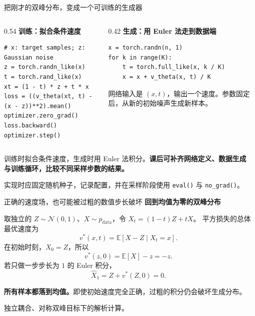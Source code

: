 \documentclass[UTF8,aspectratio=169,11pt,fontset=none]{ctexbeamer}
\newcommand{\E}{\mathbb E}
\newcommand{\pdata}{p_{\mathrm{data}}}
\newcommand{\N}{\mathcal N}
\newcommand{\head}[1]{{\color{accent}\bfseries #1}\par\vspace{0.07cm}}
\newcommand{\takeaway}[1]{\begin{tcolorbox}[enhanced,colback=paper,colframe=paper,boxrule=0pt,arc=1.5mm,left=2.5mm,right=2.5mm,top=1.7mm,bottom=1.7mm,before skip=2mm,after skip=1mm]\small #1\end{tcolorbox}}
\newcommand{\source}[1]{\vfill{\fontsize{6.3}{7.8}\selectfont\color{muted}#1\par}}
\begin{document}
\begin{frame}[fragile]{把刚才的双峰分布，变成一个可训练的生成器}
\begin{columns}[T,onlytextwidth]
\begin{column}{0.54\textwidth}
\head{训练：拟合条件速度}
\begin{lstlisting}
# x: target samples; z: Gaussian noise
z = torch.randn_like(x)
t = torch.rand_like(x)
xt = (1 - t) * z + t * x
loss = ((v_theta(xt, t) - (x - z))**2).mean()
optimizer.zero_grad()
loss.backward()
optimizer.step()
\end{lstlisting}
\end{column}
\begin{column}{0.42\textwidth}
\head{生成：用 Euler 法走到数据端}
\begin{lstlisting}
x = torch.randn(n, 1)
for k in range(K):
    t = torch.full_like(x, k / K)
    x = x + v_theta(x, t) / K
\end{lstlisting}
\vspace{0.10cm}
\small 网络输入是 $(x,t)$，输出一个速度。参数固定后，从新的初始噪声生成新样本。
\end{column}
\end{columns}
\takeaway{训练时拟合条件速度，生成时用 Euler 法积分。\textbf{课后可补齐网络定义、数据生成与训练循环，比较不同采样步数的结果。}}
\source{实现时应固定随机种子，记录配置，并在采样阶段使用 \texttt{eval()} 与 \texttt{no\_grad()}。}
\end{frame}

\begin{frame}{正确的速度场，也可能被过粗的数值步长破坏}
\head{回到均值为零的双峰分布}
取独立的 $Z\sim\N(0,1)$、$X\sim\pdata$，令 $X_t=(1-t)Z+tX$。
平方损失的总体最优速度为
\[
v^*(x,t)=\E[X-Z\mid X_t=x].
\]
在初始时刻，$X_0=Z$，所以
\[
v^*(z,0)=\E[X]-z=-z.
\]
若只做一步步长为 $1$ 的 Euler 积分，
\[
\widehat X_1=Z+v^*(Z,0)=0.
\]
\takeaway{\textbf{所有样本都落到均值。}即使初始速度完全正确，过粗的积分仍会破坏生成分布。}
\source{独立耦合、对称双峰目标下的解析计算。}
\end{frame}
\end{document}
